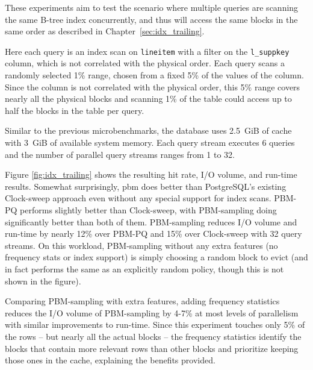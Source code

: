 These experiments aim to test the scenario where multiple queries are scanning the same B-tree index concurrently, and thus will access the same blocks in the same order as described in Chapter~\ref{sec:idx_trailing}.

Here each query is an index scan on \verb|lineitem| with a filter on the \verb|l_suppkey| column, which is not correlated with the physical order. Each query scans a randomly selected 1\% range, chosen from a fixed 5\% of the values of the column. Since the column is not correlated with the physical order, this 5\% range covers nearly all the physical blocks and scanning 1\% of the table could access up to half the blocks in the table per query.

Similar to the previous microbenchmarks, the database uses 2.5~GiB of cache with 3~GiB of available system memory. Each query stream executes 6 queries and the number of parallel query streams ranges from 1 to 32.


Figure \ref{fig:idx_trailing} shows the resulting hit rate, I/O volume, and run-time results. Somewhat surprisingly, \gls{pbm} does better than PostgreSQL's existing Clock-sweep approach even without any special support for index scans. PBM-PQ performs slightly better than Clock-sweep, with PBM-sampling doing significantly better than both of them. PBM-sampling reduces I/O volume and run-time by nearly 12\% over PBM-PQ and 15\% over Clock-sweep with 32 query streams. On this workload, PBM-sampling without any extra features (no frequency stats or index support) is simply choosing a random block to evict (and in fact performs the same as an explicitly random policy, though this is not shown in the figure). 

Comparing PBM-sampling with extra features, adding frequency statistics reduces the I/O volume of PBM-sampling by 4-7\% at most levels of parallelism with similar improvements to run-time. Since this experiment touches only 5\% of the rows -- but nearly all the actual blocks -- the frequency statistics identify the blocks that contain more relevant rows than other blocks and prioritize keeping those ones in the cache, explaining the benefits provided.





